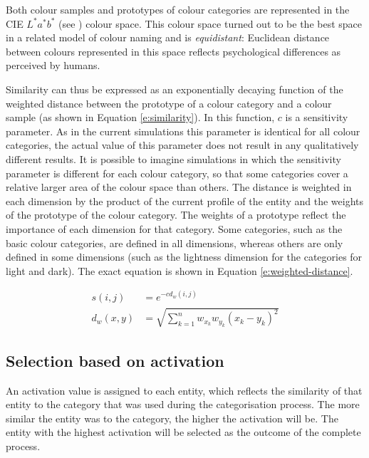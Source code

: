 Both colour samples and prototypes of colour categories are
represented in the CIE $L^*a^*b^*$ (see ) colour
space. This colour space turned out to be the best space in a related
model of colour naming \citep{lammens94computational} and is
\emph{equidistant}: Euclidean distance between colours represented in
this space reflects psychological differences as perceived by humans.

Similarity can thus be expressed as an exponentially decaying function
\citep{shepard87toward, gardenfors04conceptual} of the weighted
distance between the prototype of a colour category and a colour
sample (as shown in Equation \ref{e:similarity}). In this function,
$c$ is a sensitivity parameter. As in the current simulations this
parameter is identical for all colour categories, the actual value of
this parameter does not result in any qualitatively different
results. It is possible to imagine simulations in which the
sensitivity parameter is different for each colour category, so that some 
categories cover a relative larger area of the
colour space than others. The distance is weighted in each dimension by the
product of the current profile of the entity and the weights of the
prototype of the colour category. The weights of a prototype reflect
the importance of each dimension for that category. Some categories,
such as the basic colour categories, are defined in all dimensions,
whereas others are only defined in some dimensions (such as the
lightness dimension for the categories for light and dark). The exact
equation is shown in Equation \ref{e:weighted-distance}.

\begin{align}
s(i,j) &= e^{-cd_w(i,j)}
\label{e:similarity} \\
d_w(x,y) &= \sqrt{\sum_{k=1}^n w_{x_k}w_{y_k} (x_k - y_k)^2}
\label{e:weighted-distance}
\end{align}

\subsection{Selection based on activation}

An activation value is assigned to each entity, which reflects the
similarity of that entity to the category that was used during the
categorisation process. The more similar the entity was to the
category, the higher the activation will be. The entity with the
highest activation will be selected as the outcome of the complete
process.

